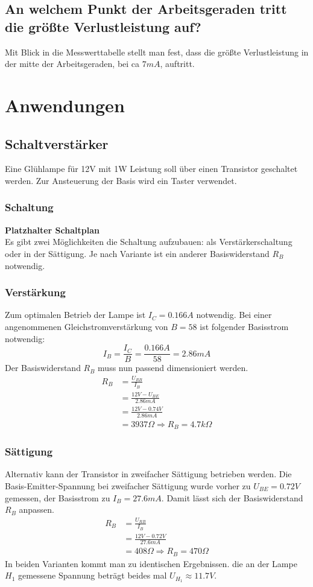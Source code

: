 \documentclass[
a4paper,     %
 headsepline, %
11pt         %
]{scrartcl}  %
\begin{document}
\subsection{An welchem Punkt der Arbeitsgeraden tritt die größte Verlustleistung auf?}
Mit Blick in die Messwerttabelle stellt man fest, dass die größte Verlustleistung in der mitte der Arbeitsgeraden, bei ca $7mA$, auftritt.

\section{Anwendungen}
\subsection{Schaltverstärker}
Eine Glühlampe für 12V mit 1W Leistung soll über einen Transistor geschaltet werden. Zur Ansteuerung der Basis wird ein Taster verwendet. 

\subsubsection*{Schaltung}
\textbf{Platzhalter Schaltplan} \\
Es gibt zwei Möglichkeiten die Schaltung aufzubauen: als Verstärkerschaltung oder in der Sättigung. Je nach Variante ist ein anderer Basiswiderstand $R_B$ notwendig.
\subsubsection*{Verstärkung}
Zum optimalen Betrieb der Lampe ist $I_C=0.166A$ notwendig. Bei einer angenommenen Gleichstromverstärkung von $B=58$ ist folgender Basisstrom notwendig:
\[I_B=\frac{I_C}{B}=\frac{0.166A}{58}=2.86mA\]
Der Basiswiderstand $R_B$ muss nun passend dimensioniert werden.
\begin{align}
R_B &= \frac{U_{RB}}{I_B} \nonumber \\
	&= \frac{12V-U_{BE}}{2.86mA} \nonumber \\
	&= \frac{12V-0.74V}{2.86mA} \nonumber \\
	&= 3937\Omega \Rightarrow R_B = 4.7k\Omega \nonumber 
\end{align}
\subsubsection*{Sättigung}
Alternativ kann der Transistor in zweifacher Sättigung betrieben werden. Die Basis-Emitter-Spannung bei zweifacher Sättigung wurde vorher zu $U_{BE}=0.72V$ gemessen, der Basisstrom zu $I_B=27.6mA$. Damit lässt sich der Basiswiderstand $R_B$ anpassen.
\begin{align}
R_B &= \frac{U_{RB}}{I_B} \nonumber \\
	&= \frac{12V-0.72V}{27.6mA} \nonumber \\
	&= 408\Omega \Rightarrow R_B = 470\Omega \nonumber 
\end{align}
In beiden Varianten kommt man zu identischen Ergebnissen. die an der Lampe $H_1$ gemessene Spannung beträgt beides mal $U_{H_1}\approx 11.7V$.
\end{document}
